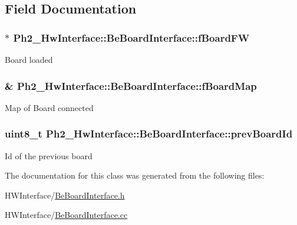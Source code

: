 \subsection{Field Documentation}
\hypertarget{class_ph2___hw_interface_1_1_be_board_interface_a763c8be5545618fb5ca0dfe01667f9ae}{
\subsubsection[{f\-Board\-F\-W}]{$\ast$ Ph2\-\_\-\-Hw\-Interface\-::\-Be\-Board\-Interface\-::f\-Board\-F\-W\hspace{0.3cm}{\ttfamily [private]}}}\label{class_ph2___hw_interface_1_1_be_board_interface_a763c8be5545618fb5ca0dfe01667f9ae}
Board loaded \hypertarget{class_ph2___hw_interface_1_1_be_board_interface_aff153bb1272b1f145c919a9ba2cc572d}{
\subsubsection[{f\-Board\-Map}]{\& Ph2\-\_\-\-Hw\-Interface\-::\-Be\-Board\-Interface\-::f\-Board\-Map\hspace{0.3cm}{\ttfamily [private]}}}\label{class_ph2___hw_interface_1_1_be_board_interface_aff153bb1272b1f145c919a9ba2cc572d}
Map of Board connected \hypertarget{class_ph2___hw_interface_1_1_be_board_interface_af248fa0474f163d72349854f12d3ad61}{
\subsubsection[{prev\-Board\-Id}]{\setlength{\rightskip}{0pt plus 5cm}uint8\-\_\-t Ph2\-\_\-\-Hw\-Interface\-::\-Be\-Board\-Interface\-::prev\-Board\-Id\hspace{0.3cm}{\ttfamily [private]}}}\label{class_ph2___hw_interface_1_1_be_board_interface_af248fa0474f163d72349854f12d3ad61}
Id of the previous board 

The documentation for this class was generated from the following files\-:\begin{DoxyCompactItemize}
\item 
H\-W\-Interface/\hyperlink{_be_board_interface_8h}{Be\-Board\-Interface.\-h}\item 
H\-W\-Interface/\hyperlink{_be_board_interface_8cc}{Be\-Board\-Interface.\-cc}\end{DoxyCompactItemize}
